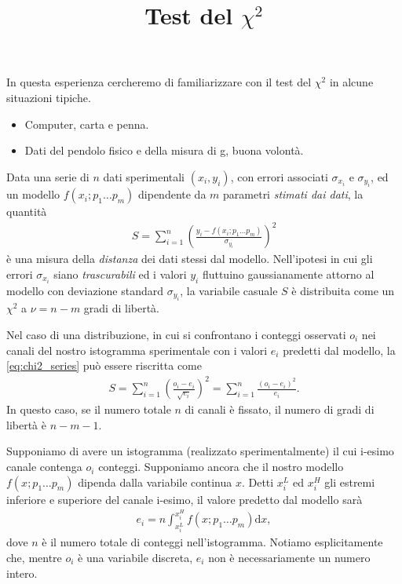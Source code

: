 \documentclass{lab1-article}
\title{Test del $\chi^2$}
\begin{document}
\begin{article}

\maketitle

\secsummary

In questa esperienza cercheremo di familiarizzare con il test del $\chi^2$ in
alcune situazioni tipiche.


\secmaterials

\begin{itemize}
\item Computer, carta e penna.
\item Dati del pendolo fisico e della misura di g, buona volont\`a.
\end{itemize}


\secdefinitions

Data una serie di $n$ dati sperimentali $(x_i, y_i)$, con errori associati
$\sigma_{x_i}$ e $\sigma_{y_i}$, ed un modello $f(x_i;p_1\ldots p_m)$ dipendente
da $m$ parametri \emph{stimati dai dati}, la quantit\`a
\begin{align}\label{eq:chi2_series}
  S = \sum_{i = 1}^{n}
  \left( \frac{y_i - f(x_i;p_1\ldots p_m)}{\sigma_{y_i}} \right)^2
\end{align}
\`e una misura della \emph{distanza} dei dati stessi dal modello. Nell'ipotesi
in cui gli errori $\sigma_{x_i}$ siano \emph{trascurabili} ed i valori $y_i$
fluttuino gaussianamente attorno al modello con deviazione standard
$\sigma_{y_i}$, la variabile casuale $S$ \`e distribuita come un $\chi^2$ a
$\nu = n - m$ gradi di libert\`a.

Nel caso di una distribuzione, in cui si confrontano i conteggi osservati
$o_i$ nei canali del nostro istogramma sperimentale con i valori $e_i$ predetti
dal modello, la \eqref{eq:chi2_series} pu\`o essere riscritta come
\begin{align}
   S = \sum_{i = 1}^{n} \left( \frac{o_i - e_i}{\sqrt{e_i}} \right)^2 =
   \sum_{i = 1}^{n} \frac{(o_i - e_i)^2}{e_i}.
\end{align}
In questo caso, se il numero totale $n$ di canali \`e fissato,
il numero di gradi di libert\`a \`e $n - m - 1$.


\secconsiderations


Supponiamo di avere un istogramma (realizzato sperimentalmente) il cui
i-esimo canale contenga $o_i$ conteggi. Supponiamo ancora che il nostro
modello $f(x;p_1\ldots p_m)$ dipenda dalla variabile continua $x$.
Detti $x^L_i$ ed $x^H_i$ gli estremi inferiore e superiore del canale i-esimo,
il valore predetto dal modello sar\`a
\begin{align}
  e_i = n\int_{x^L_i}^{x^H_i} f(x;p_1\ldots p_m) \text{d}x,
\end{align}
dove $n$ \`e il numero totale di conteggi nell'istogramma. Notiamo
esplicitamente che, mentre $o_i$ \`e una variabile discreta, $e_i$ non
\`e necessariamente un numero intero.


\end{article}
\end{document}
